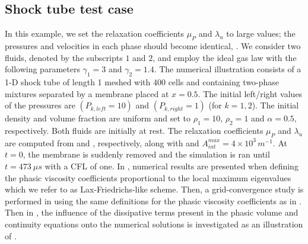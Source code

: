 \subsection{Shock tube test case}\label{sec:first-test}
%
In this example, we set the relaxation coefficients $\mu_P$ and $\lambda_u$ to large values; the pressures and velocities in each phase should become identical, . 
We consider two fluids, denoted by the subscripts $1$ and $2$, and employ the ideal gas law with the following parameters $\gamma_1=3$ and $\gamma_2=1.4$. 
The numerical illustration consists of a 1-D shock tube of length 1 meshed with 400 cells and containing two-phase mixtures separated by a membrane placed at $x=0.5$. 
The initial left/right values of the pressures are
 $(P_{k,left}=10)$ and $(P_{k,right}=1)$ (for $k=1,2$). The initial density and volume fraction are uniform and set to $\rho_1=10$, $\rho_2=1$ and $\alpha = 0.5$, respectively. 
Both fluids are initially at rest. The relaxation coefficients $\mu_P$ and $\lambda_u$ are computed from  and , respectively, 
along with  and $A_{int}^{max}=4 \times 10^3\,m^{-1}$. At $t=0$, the membrane is suddenly removed and the simulation is ran until $t=473 \ \mu s$ with a CFL of one. 
In , numerical results are presented when defining the phasic viscosity coefficients proportional to the local maximum eigenvalues which we refer to as Lax-Friedrichs-like scheme. 
Then, a grid-convergence study is performed in  using the same definitions for the phasic viscosity coefficients as in . Then in , the influence of the dissipative terms present in the phasic volume and continuity equations onto the numerical solutions is investigated as an illustration of . %
%
